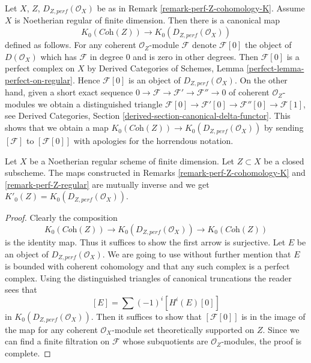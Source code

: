 \begin{remark}
\label{remark-perf-Z-regular}
Let $X$, $Z$, $D_{Z, perf}(\mathcal{O}_X)$ be as in
Remark \ref{remark-perf-Z-cohomology-K}.
Assume $X$ is Noetherian regular of finite dimension.
Then there is a canonical map
$$
K_0(\textit{Coh}(Z)) \longrightarrow K_0(D_{Z, perf}(\mathcal{O}_X))
$$
defined as follows. For any coherent $\mathcal{O}_Z$-module
$\mathcal{F}$ denote $\mathcal{F}[0]$ the object of $D(\mathcal{O}_X)$
which has $\mathcal{F}$ in degree $0$ and is zero in other degrees.
Then $\mathcal{F}[0]$ is a perfect complex on $X$ by
Derived Categories of Schemes, Lemma \ref{perfect-lemma-perfect-on-regular}.
Hence $\mathcal{F}[0]$ is an object of $D_{Z, perf}(\mathcal{O}_X)$.
On the other hand, given a short exact sequence
$0 \to \mathcal{F} \to \mathcal{F}' \to \mathcal{F}'' \to 0$ of
coherent $\mathcal{O}_Z$-modules we obtain a distinguished triangle
$\mathcal{F}[0] \to \mathcal{F}'[0] \to \mathcal{F}''[0] \to \mathcal{F}[1]$,
see Derived Categories, Section \ref{derived-section-canonical-delta-functor}.
This shows that we obtain a map
$K_0(\textit{Coh}(Z)) \to K_0(D_{Z, perf}(\mathcal{O}_X))$
by sending $[\mathcal{F}]$ to $[\mathcal{F}[0]]$
with apologies for the horrendous notation.
\end{remark}

\begin{lemma}
\label{lemma-perf-Z-regular}
Let $X$ be a Noetherian regular scheme of finite dimension.
Let $Z \subset X$ be a closed subscheme. The maps constructed
in Remarks \ref{remark-perf-Z-cohomology-K} and
\ref{remark-perf-Z-regular} are mutually inverse and we get
$K'_0(Z) = K_0(D_{Z, perf}(\mathcal{O}_X))$.
\end{lemma}

\begin{proof}
Clearly the composition
$$
K_0(\textit{Coh}(Z)) \longrightarrow
K_0(D_{Z, perf}(\mathcal{O}_X)) \longrightarrow
K_0(\textit{Coh}(Z))
$$
is the identity map. Thus it suffices to show the first arrow is
surjective. Let $E$ be an object of $D_{Z, perf}(\mathcal{O}_X)$.
We are going to use without further mention that $E$ is bounded
with coherent cohomology and that any such complex is a perfect complex.
Using the distinguished triangles of canonical truncations the
reader sees that
$$
[E] = \sum (-1)^i[H^i(E)[0]]
$$
in $K_0(D_{Z, perf}(\mathcal{O}_X))$. Then it suffices to
show that $[\mathcal{F}[0]]$ is in the image of the map
for any coherent $\mathcal{O}_X$-module set theoretically
supported on $Z$. Since we can find a finite filtration on
$\mathcal{F}$ whose subquotients are $\mathcal{O}_Z$-modules,
the proof is complete.
\end{proof}


